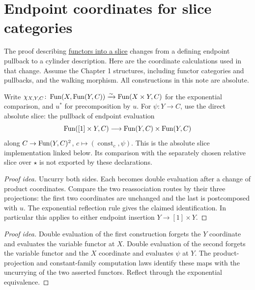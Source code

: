\documentclass[11pt]{article}
\begin{document}
\section*{Endpoint coordinates for slice categories}

The proof describing \href{slice-categories.html}{functors into a slice}
changes from a defining endpoint pullback to a cylinder description.
Here are the coordinate calculations used in that change.
Assume the Chapter 1 structures, including functor categories and pullbacks,
and the walking morphism. All constructions in this note are absolute.

Write
$\chi_{X,Y,C}\colon\operatorname{Fun}(X,\operatorname{Fun}(Y,C))\xrightarrow{\sim}\operatorname{Fun}(X\times Y,C)$
for the exponential comparison, and $u^*$ for precomposition by $u$.
For $\psi\colon Y\to C$, use the direct absolute slice: the pullback of
endpoint evaluation
\[
 \operatorname{Fun}([1]\times Y,C)\longrightarrow\operatorname{Fun}(Y,C)\times\operatorname{Fun}(Y,C)
\]
along $C\to\operatorname{Fun}(Y,C)^2$, $c\mapsto(\operatorname{const}_c,\psi)$.
This is the absolute slice implementation linked below. Its comparison
with the separately chosen relative slice over $\star$ is not exported
by these declarations.

\begin{proof}[Proof idea]
Uncurry both sides. Each becomes double evaluation after a change of
product coordinates. Compare the two reassociation routes by their three
projections: the first two coordinates are unchanged and the last is
postcomposed with $u$. The exponential reflection rule gives the claimed
identification. In particular this applies to either endpoint insertion
$Y\to[1]\times Y$.
\end{proof}

\begin{proof}[Proof idea]
Double evaluation of the first construction forgets the $Y$ coordinate
and evaluates the variable functor at $X$. Double evaluation of the second
forgets the variable functor and the $X$ coordinate and evaluates $\psi$
at $Y$. The product-projection and constant-family computation laws
identify these maps with the uncurrying of the two asserted functors.
Reflect through the exponential equivalence.
\end{proof}
\end{document}
